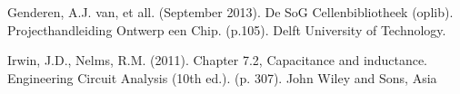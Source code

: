 \documentclass{article}
\begin{document}
\begin{thebibliography}{La}
%

Genderen, A.J. van, et all. (September 2013). De SoG Cellenbibliotheek (oplib). Projecthandleiding Ontwerp een Chip. (p.105). Delft University of Technology.

Irwin, J.D., Nelms, R.M. (2011). Chapter 7.2, Capacitance and inductance. Engineering Circuit Analysis (10th ed.). (p. 307). John Wiley and Sons, Asia

\end{thebibliography}
\end{document}

